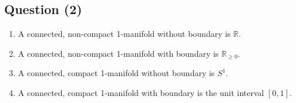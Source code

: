 \documentclass{article}
\begin{document}
\begin{center}
\section*{Question (2)}
\end{center}

\begin{flushleft}
\begin{enumerate}[label=(\alph*)]
    \item A connected, non-compact 1-manifold without boundary is $\mathbb{R}$.
    \item A connected, non-compact 1-manifold with boundary is $\mathbb{R}_{\geq0}$.
    \item A connected, compact 1-manifold without boundary is $S^1$.
    \item A connected, compact 1-manifold with boundary is the unit interval $[0,1]$.
\end{enumerate}
\end{flushleft}
\end{document}
